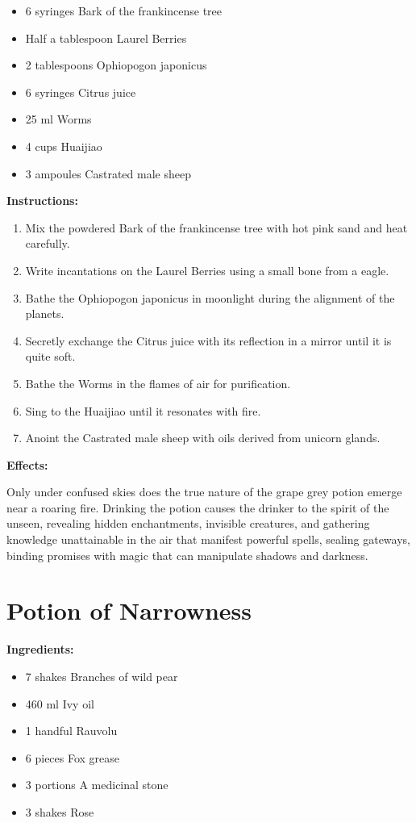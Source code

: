 \documentclass{article}
\begin{document}
\begin{itemize}
  \item 6 syringes Bark of the frankincense tree
  \item Half a tablespoon Laurel Berries
  \item 2 tablespoons Ophiopogon japonicus
  \item 6 syringes Citrus juice
  \item 25 ml Worms
  \item 4 cups Huaijiao
  \item 3 ampoules Castrated male sheep
\end{itemize}

\textbf{Instructions:}

\begin{enumerate}
  \item Mix the powdered Bark of the frankincense tree with hot pink sand and heat carefully.
  \item Write incantations on the Laurel Berries using a small bone from a eagle.
  \item Bathe the Ophiopogon japonicus in moonlight during the alignment of the planets.
  \item Secretly exchange the Citrus juice with its reflection in a mirror until it is quite soft.
  \item Bathe the Worms in the flames of air for purification.
  \item Sing to the Huaijiao until it resonates with fire.
  \item Anoint the Castrated male sheep with oils derived from unicorn glands.
\end{enumerate}

\textbf{Effects:}

Only under confused skies does the true nature of the grape grey potion emerge near a roaring fire. Drinking the potion causes the drinker to the spirit of the unseen, revealing hidden enchantments, invisible creatures, and gathering knowledge unattainable in the air that manifest powerful spells, sealing gateways, binding promises with magic that can manipulate shadows and darkness.

\newpage
\section*{Potion of Narrowness}

\textbf{Ingredients:}

\begin{itemize}
  \item 7 shakes Branches of wild pear
  \item 460 ml Ivy oil
  \item 1 handful Rauvolu
  \item 6 pieces Fox grease
  \item 3 portions A medicinal stone
  \item 3 shakes Rose
\end{itemize}
\end{document}
